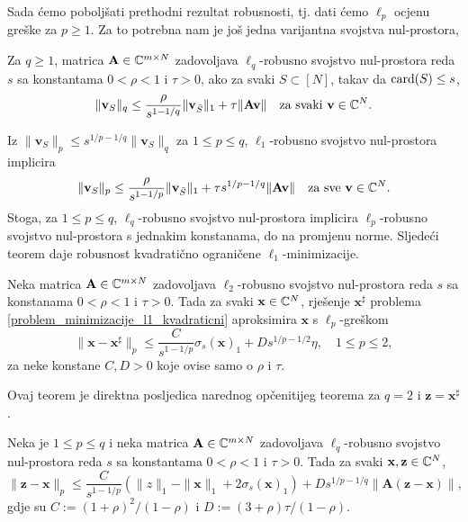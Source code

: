 \documentclass[a4paper,twoside,12pt]{memoir} %
\newcommand{\vect}[1]{\mathbf{#1}}
\renewcommand{\vec}{\vect}
\newcommand{\card}{\text{\normalfont{card}}}
\newcommand{\norm}[1]{\|{#1}\|}
\begin{document}
Sada \'cemo pobolj\v{s}ati prethodni rezultat robusnosti, tj. dati \'cemo $\ell_p$ ocjenu gre\v{s}ke za $p \geq 1$. Za to potrebna nam je jo\v{s} jedna varijantna svojstva nul-prostora,
\begin{defn}
    Za $q \geq 1$, matrica $\vec A \in \C^{m \times N}$ zadovoljava $\ell_q$-robusno svojstvo nul-prostora reda $s$ sa konstantama $0 < \rho < 1$ i $\tau > 0$, ako za svaki $S \subset [N]$, takav da $\card(S) \leq s$,
    \begin{equation*}
        \norm{\vec v_S}_q \leq \frac{\rho}{s^{1-1/q}}\norm{\vec v_{\bar S}}_1 + \tau \norm{\vec{Av}}\quad \text{za svaki }\vec{v} \in \C^N.
    \end{equation*}
\end{defn}
\noindent Iz $\norm{\vec v_S}_p \leq s^{1/p - 1/q}\norm{\vec v_S}_q$ za $1 \leq p \leq q$, $\ell_1$-robusno svojstvo nul-prostora implicira
\begin{equation*}
    \norm{\vec v_S}_p \leq \frac{\rho}{s^{1-1/p}}\norm{\vec v_{\bar S}}_1 + \tau s^{1/p-1/q}\norm{\vec{Av}} \quad \text{za sve } \vec v \in \C^N.
\end{equation*}
Stoga, za $1 \leq p \leq q$, $\ell_q$-robusno svojstvo nul-prostora implicira $\ell_p$-robusno svojstvo nul-prostora s jednakim konstanama, do na promjenu norme. Sljede\'ci teorem daje robusnost kvadrati\v{c}no ograni\v{c}ene $\ell_1$-minimizacije.
\begin{thm}\label{robusnost_l1_min_kvad_ogr}
    Neka matrica $\vec A \in \C^{m \times N}$  zadovoljava $\ell_2$-robusno svojstvo nul-prostora reda $s$ sa konstanama $0<\rho<1$ i $\tau >0$. Tada za svaki $\vec x \in \C^N$, rje\v{s}enje $\vec x^{\sharp}$ problema \eqref{problem_minimizacije_l1_kvadraticni} aproksimira $\vec x$ s $\ell_p$-gre\v{s}kom
    \begin{equation}
        \norm{\vec x - \vec x^{\sharp}}_p \leq \frac{C}{s^{1-1/p}} \sigma_s(\vec x)_1 + D s^{1/p - 1/2} \eta, \quad 1 \leq p \leq 2,
    \end{equation}
    za neke konstane $C,D > 0$ koje ovise samo o $\rho$ i $\tau$.
\end{thm}
Ovaj teorem je direktna posljedica narednog op\v{c}enitijeg teorema za $q = 2$ i $\vec z = \vec x^{\sharp}$.
\begin{thm}
    Neka je $1 \leq p \leq q$ i neka matrica $\vec A \in \C^{m \times N}$ zadovoljava $\ell_q$-robusno svojstvo nul-prostora reda $s$ sa konstantama $0 < \rho < 1$ i $\tau > 0$. Tada za svaki $\vec x, \vec z \in \C^N$,
    \begin{equation*}
        \norm{\vec z - \vec x}_p \leq \frac{C}{s^{1-1/p}}(\norm{z}_1 - \norm{\vec x}_1 + 2 \sigma_s(\vec x)_1) + D s^{1/p-1/q} \norm{\vec A (\vec z - \vec x)},
    \end{equation*}
    gdje su $C:=(1+\rho)^2/(1-\rho)$ i $D:=(3+\rho)\tau/(1-\rho)$.
\end{thm}
\end{document}
